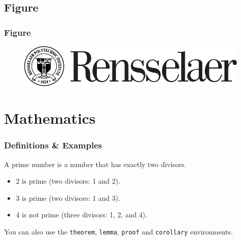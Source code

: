 \documentclass[
11pt, %
serif
]{beamer}
\begin{document}
	
	\subsection{Figure}
	
	\begin{frame}
		\frametitle{Figure}
		
		\begin{figure}
			\includegraphics[width=0.8\linewidth]{rpi-small.png}
			
		\end{figure}
	\end{frame}
	
	
	\section{Mathematics}
	
	\begin{frame}
		\frametitle{Definitions \& Examples}
		
		\begin{definition}
			A \alert{prime number} is a number that has exactly two divisors.
		\end{definition}
		
		\smallskip %
		
		\begin{example}
			\begin{itemize}
				\item 2 is prime (two divisors: 1 and 2).
				\item 3 is prime (two divisors: 1 and 3).
				\item 4 is not prime (\alert{three} divisors: 1, 2, and 4).
			\end{itemize}
		\end{example}
		
		\smallskip %
		
		You can also use the \texttt{theorem}, \texttt{lemma}, \texttt{proof} and \texttt{corollary} environments.
	\end{frame}
	
	
\end{document}
